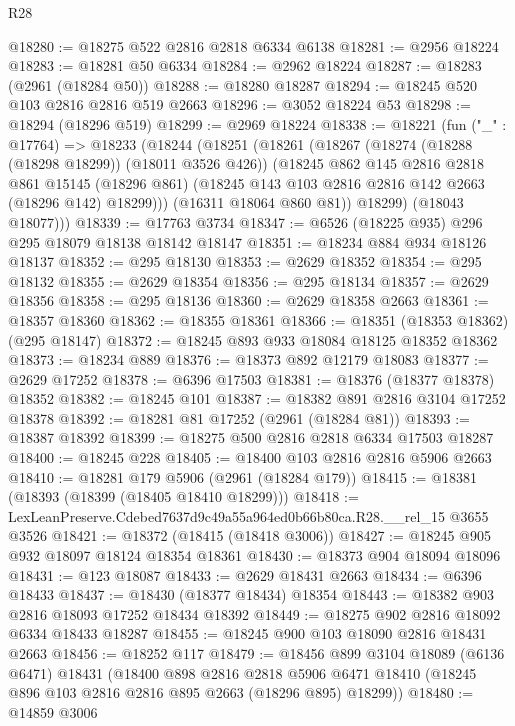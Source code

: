 \begin{lexlean}{R28}
\begin{coremodule}
@18280 := @18275 @522 @2816 @2818 @6334 @6138
@18281 := @2956 @18224
@18283 := @18281 @50 @6334
@18284 := @2962 @18224
@18287 := @18283 (@2961 (@18284 @50))
@18288 := @18280 @18287
@18294 := @18245 @520 @103 @2816 @2816 @519 @2663
@18296 := @3052 @18224 @53
@18298 := @18294 (@18296 @519)
@18299 := @2969 @18224
@18338 := @18221
    (fun ("_" : @17764) =>
    @18233
      (@18244
        (@18251
          (@18261
            (@18267
              (@18274 (@18288 (@18298 @18299)) (@18011 @3526 @426))
              (@18245
                @862
                @145
                @2816
                @2818
                @861
                @15145
                (@18296 @861)
                (@18245 @143 @103 @2816 @2816 @142 @2663 (@18296 @142) @18299)))
            (@16311 @18064 @860 @81))
          @18299)
        (@18043 @18077)))
@18339 := @17763 @3734
@18347 := @6526 (@18225 @935) @296 @295 @18079 @18138 @18142 @18147
@18351 := @18234 @884 @934 @18126 @18137
@18352 := @295 @18130
@18353 := @2629 @18352
@18354 := @295 @18132
@18355 := @2629 @18354
@18356 := @295 @18134
@18357 := @2629 @18356
@18358 := @295 @18136
@18360 := @2629 @18358 @2663
@18361 := @18357 @18360
@18362 := @18355 @18361
@18366 := @18351 (@18353 @18362) (@295 @18147)
@18372 := @18245 @893 @933 @18084 @18125 @18352 @18362
@18373 := @18234 @889
@18376 := @18373 @892 @12179 @18083
@18377 := @2629 @17252
@18378 := @6396 @17503
@18381 := @18376 (@18377 @18378) @18352
@18382 := @18245 @101
@18387 := @18382 @891 @2816 @3104 @17252 @18378
@18392 := @18281 @81 @17252 (@2961 (@18284 @81))
@18393 := @18387 @18392
@18399 := @18275 @500 @2816 @2818 @6334 @17503 @18287
@18400 := @18245 @228
@18405 := @18400 @103 @2816 @2816 @5906 @2663
@18410 := @18281 @179 @5906 (@2961 (@18284 @179))
@18415 := @18381 (@18393 (@18399 (@18405 @18410 @18299)))
@18418 := LexLeanPreserve.Cdebed7637d9c49a55a964ed0b66b80ca.R28.__rel_15 @3655 @3526
@18421 := @18372 (@18415 (@18418 @3006))
@18427 := @18245 @905 @932 @18097 @18124 @18354 @18361
@18430 := @18373 @904 @18094 @18096
@18431 := @123 @18087
@18433 := @2629 @18431 @2663
@18434 := @6396 @18433
@18437 := @18430 (@18377 @18434) @18354
@18443 := @18382 @903 @2816 @18093 @17252 @18434 @18392
@18449 := @18275 @902 @2816 @18092 @6334 @18433 @18287
@18455 := @18245 @900 @103 @18090 @2816 @18431 @2663
@18456 := @18252 @117
@18479 := @18456
    @899
    @3104
    @18089
    (@6136 @6471)
    @18431
    (@18400
      @898
      @2816
      @2818
      @5906
      @6471
      @18410
      (@18245 @896 @103 @2816 @2816 @895 @2663 (@18296 @895) @18299))
@18480 := @14859 @3006

\end{coremodule}
\end{lexlean}

